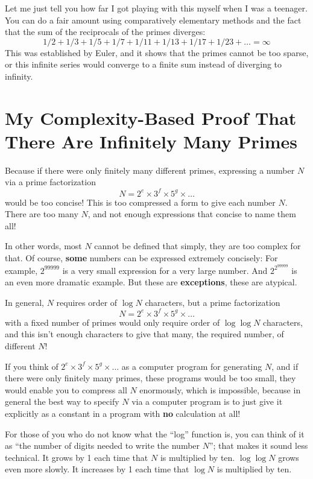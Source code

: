 \documentclass[12pt]{book}
\begin{document}
Let me just tell you how far I got playing with this myself 
when I was a teenager.
You can do a fair amount using comparatively elementary methods and the fact that
the sum of the reciprocals of the primes diverges:
\[
   1/2 + 1/3 + 1/5 + 1/7 + 1/11 + 1/13 + 1/17 + 1/23 + \ldots = \infty
\]
This was established by Euler, and it
shows that the primes cannot be too sparse, 
or this infinite series would converge to a finite sum instead of diverging to infinity.

\section*{My Complexity-Based Proof That There Are Infinitely Many Primes}

Because if there were only finitely many different primes, 
expressing a number $N$ via a prime factorization 
\[
   N = 2^e \times 3^f \times 5^g \times \ldots 
\]
would be too concise!
This is too compressed a form to give each number $N$.  There are too many $N$, and not enough
expressions that concise to name them all!

In other words, most $N$ cannot be defined that simply, they are too complex for that.
Of course, \textbf{some} numbers can be expressed extremely concisely: For example,
$2^{99999}$ is a very small expression for a very large number.  And
$2^{2^{99999}}$ is an even more dramatic example.  But these are \textbf{exceptions},
these are atypical.

In general, $N$ requires order of $\log N$ characters, but a prime factorization 
\[
   N = 2^e \times 3^f \times 5^g \times \ldots 
\]
with
a fixed number of primes would only require order of $\log \log N$ characters, and this isn't enough
characters to give that many, the required number, of different $N$!

If you think of
$2^e \times 3^f \times 5^g \times \ldots$ 
as a computer program for generating $N$, and if there were only finitely many primes,
these programs would be too small, they would enable you to compress all $N$ enormously, which
is impossible, because in general the best way to specify $N$ via a computer program is to just
give it explicitly as a constant in a program with \textbf{no} calculation at all!

For those of you who do not know what the ``log'' function is, you can think of it 
as ``the number of digits needed to write the number $N$''; that makes it sound less technical.
It grows by 1 each time that $N$ is multiplied by ten.
$\log \log N$ grows even more slowly.
It increases by 1 each time that $\log N$ is multiplied by ten.
\end{document}
